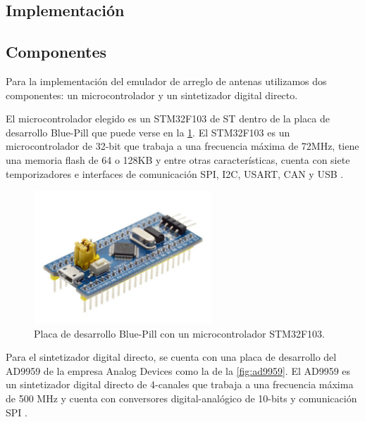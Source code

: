 \documentclass{article}
\newenvironment{standalone}{\begin{preview}}{\end{preview}}
\begin{document}
\begin{standalone}
  \section{Implementación}

  \subsection{Componentes}

  Para la implementación del emulador de arreglo de antenas utilizamos dos componentes: un microcontrolador y un sintetizador digital directo.

  El microcontrolador elegido es un STM32F103 de ST dentro de la placa de desarrollo Blue-Pill que puede verse en la \cref{fig:blue-pill}.
  El STM32F103 es un microcontrolador de 32-bit que trabaja a una frecuencia máxima de 72MHz, tiene una memoria flash de 64 o 128KB y entre otras características, cuenta con siete temporizadores e interfaces de comunicación SPI, I2C, USART, CAN y USB \cite{STM32F103_datasheet}.

  \begin{figure}[!htbp]
    \centering
    \includegraphics[width=\linewidth, height=50mm, keepaspectratio]{../images/bluepill-stm32.jpg}
    \caption{Placa de desarrollo Blue-Pill con un microcontrolador STM32F103.}
    \label{fig:blue-pill}
  \end{figure}

  Para el sintetizador digital directo, se cuenta con una placa de desarrollo del AD9959 de la empresa Analog Devices como la de la \cref{fig:ad9959}.
  El AD9959 es un sintetizador digital directo de 4-canales que trabaja a una frecuencia máxima de 500 MHz y cuenta con conversores digital-analógico de 10-bits y comunicación SPI \cite{ad9959_datasheet}.


\end{standalone}
\end{document}
